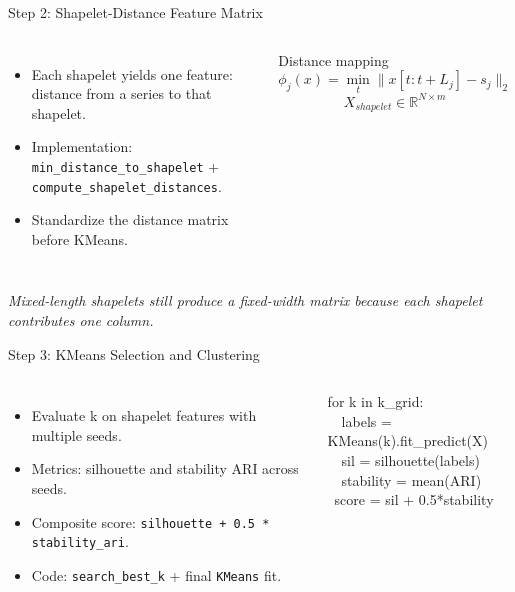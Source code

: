 \documentclass[aspectratio=169]{beamer}
\begin{document}
\begin{frame}{Step 2: Shapelet-Distance Feature Matrix}
\begin{columns}[T,onlytextwidth]
  \begin{itemize}\footnotesize\setlength\itemsep{4pt}
    \item Each shapelet yields one feature: distance from a series to that shapelet.
    \item Implementation: \texttt{min\_distance\_to\_shapelet} + \texttt{compute\_shapelet\_distances}.
    \item Standardize the distance matrix before KMeans.
  \end{itemize}
  \begin{block}{Distance mapping}
  \vspace{-6pt}
  \[
  \phi_j(x) = \min_{t} \lVert x[t:t+L_j] - s_j \rVert_2
  \]
  \[
  X_{shapelet} \in \mathbb{R}^{N \times m}
  \]
  \end{block}
\end{columns}
\vspace{4pt}
{\scriptsize\itshape Mixed-length shapelets still produce a fixed-width matrix because each shapelet contributes one column.}
\end{frame}

\begin{frame}{Step 3: KMeans Selection and Clustering}
\begin{columns}[T,onlytextwidth]
  \begin{itemize}\footnotesize\setlength\itemsep{4pt}
    \item Evaluate k on shapelet features with multiple seeds.
    \item Metrics: silhouette and stability ARI across seeds.
    \item Composite score: \texttt{silhouette + 0.5 * stability\_ari}.
    \item Code: \texttt{search\_best\_k} + final \texttt{KMeans} fit.
  \end{itemize}
  \begin{tcolorbox}[enhanced,boxrule=1pt,arc=2pt,colback=clight,colframe=cmid]
    \ttfamily\footnotesize
    for k in k\_grid:\\
    \ \ labels = KMeans(k).fit\_predict(X)\\
    \ \ sil = silhouette(labels)\\
    \ \ stability = mean(ARI)\\
    \ score = sil + 0.5*stability
  \end{tcolorbox}
\end{columns}
\end{frame}
\end{document}
